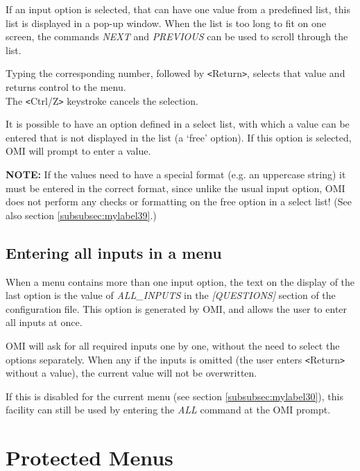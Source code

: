 \documentclass[a4paper]{book}
\newcommand{\vs}{\vspace{3mm}}
\newcommand{\lt}{\texttt{<}}
\newcommand{\gt}{\texttt{>}}
\begin{document}
If an input option is selected, that can have one value from a predefined 
list, this list is displayed in a pop-up window. When the list is too long 
to fit on one screen, the commands \textsl{NEXT} and \textsl{PREVIOUS} can be used to scroll 
through the list.

Typing the corresponding number, followed by \lt Return\gt , selects that value 
and returns control to the menu. \\
The \lt Ctrl/Z\gt{} keystroke cancels the selection.

\vs

It is possible to have an option defined in a select list, with which a 
value can be entered that is not displayed in the list (a `free' option). If 
this option is selected, OMI will prompt to enter a value.

\vs 

\hspace{-8mm}\textbf{NOTE:} If the values need to have a special format (e.g. an 
uppercase string) it must be entered in the correct format, since unlike the 
usual input option, OMI does not perform any checks or formatting on the 
free option in a select list! (See also section \ref{subsubsec:mylabel39}.)

\subsection{Entering all inputs in a menu}
\label{subsubsec:entering}

When a menu contains more than one input option, the text on the display of the last 
option is the value of \textsl{ALL{\_}INPUTS}  in the 
\textsl{[QUESTIONS]} section of the configuration file. This option is generated by 
OMI, and allows the user to enter all inputs at once.

\vs

OMI will ask for all required inputs one by one, without the need to select 
the options separately. When any if the inputs is omitted (the user enters 
\lt Return\gt{} without a value), the current value will not be overwritten.

If this is disabled for the current menu (see section \ref{subsubsec:mylabel30}),
this facility can still be used by entering the \textsl{ALL} command at the OMI prompt.

\section{Protected Menus}
\label{subsec:protected}
\end{document}
